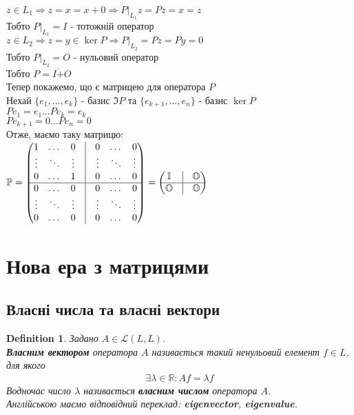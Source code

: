 \documentclass[a4paper, 10pt]{article}
\theoremstyle{theoremdd}
\newtheorem{definition}[theorem]{Definition}
\begin{document}
$z \in L_1 \Rightarrow z = x = x+0 \Rightarrow P|_{L_1}z = Pz = x = z$\\
Тобто $P|_{L_1} = I$ - тотожній оператор\\
$z \in L_2 \Rightarrow z = y \in \ker P \Rightarrow P|_{L_2} = Pz = Py = 0$\\
Тобто $P|_{L_2} = O$ - нульовий оператор\\
Тобто $P = I \dot{+} O$
\bigskip \\
Тепер покажемо, що є матрицею для оператора $P$\\
Нехай $\{e_1,\dots,e_k\}$ - базис $\Im P$ та $\{e_{k+1},\dots,e_n\}$ - базис $\ker P$\\
$Pe_1 = e_1 \dots Pe_k = e_k$\\
$Pe_{k+1} = 0 \dots Pe_n = 0$\\
Отже, маємо таку матрицю:\\
$\mathbb{P} = \begin{pmatrix}
1 & \dots & 0 & \vline & 0 & \dots & 0 \\
\vdots & \ddots & \vdots & \vline & \vdots & \ddots & \vdots \\
0 & \dots & 1 & \vline & 0 & \dots & 0 \\
\hline
0 & \dots & 0 & \vline & 0 & \dots & 0 \\
\vdots & \ddots & \vdots & \vline & \vdots & \ddots & \vdots \\
0 & \dots & 0 & \vline & 0 & \dots & 0 \\
\end{pmatrix} = \begin{pmatrix}
\mathbb{I}  & \vline & \mathbb{O} \\
 \hline
\mathbb{O} & \vline & \mathbb{O}
\end{pmatrix}$
\fi

\newpage
\setcounter{section}{3}
\setcounter{subsection}{0}
\section{Нова ера з матрицями}
\subsection{Власні числа та власні вектори}
\begin{definition}
Задано $A \in \mathcal{L}(L,L)$.\\
\textbf{Власним вектором} оператора $A$ називається такий ненульовий елемент $f \in L$, для якого
\begin{align*}
\exists \lambda \in \mathbb{R}: Af = \lambda f
\end{align*}
Водночас число $\lambda$ називається \textbf{власним числом} оператора $A$.\\
Англійською маємо відповідний переклад: \textbf{eigenvector}, \textbf{eigenvalue}.
\end{definition}
\end{document}
